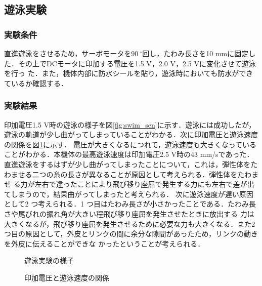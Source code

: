 \subsection{遊泳実験}
\subsubsection{実験条件}
直進遊泳をさせるため，サーボモータを$90\:^\circ$回し，たわみ長さを10 mmに固定した．その上でDCモータに印加する電圧を1.5 V，2.0 V，2.5 Vに変化させて遊泳を行っ
た．また，機体内部に防水シールを貼り，遊泳時においても防水ができているか確認する．



\subsubsection{実験結果}
印加電圧1.5 V時の遊泳の様子を図\ref{fig:swim_sen}に示す．遊泳には成功したが，遊泳の軌道が少し曲がってしまっていることがわかる．次に印加電圧と遊泳速度の関係を図\ref{fig:speed}に示す．
電圧が大きくなるにつれて，遊泳速度も大きくなっていることがわかる．本機体の最高遊泳速度は印加電圧2.5 V時の43 mm/sであった．
直進遊泳をするはずが少し曲がってしまったことについて，これは，弾性体をたわませる二つの糸の長さが異なることが原因として考えられる．弾性体をたわませ
る力が左右で違ったことにより飛び移り座屈で発生する力にも左右で差が出てしまうので，結果曲がってしまったと考えられる．
次に遊泳速度が遅い原因として2 つ考えられる．1 つ目はたわみ長さが小さかったことである．たわみ長さや尾びれの振れ角が大きい程飛び移り座屈を発生させたときに放出する
力は大きくなるが，飛び移り座屈を発生させるために必要な力も大きくなる．また2 つ目の原因として，外皮とリンクの間に余分な隙間があったため，リンクの動きを外皮に伝えることができな
かったということが考えられる．
\begin{figure}[htbp]
    \centering
    \begin{minipage}[b]{0.5\linewidth}
        \centering
        \caption{遊泳実験の様子\cite{kyu}}
        \label{fig:swim_sen}  
    \end{minipage}
    \hspace{0.05\linewidth}
    \begin{minipage}[b]{0.4\linewidth}
        \centering
        \caption{印加電圧と遊泳速度の関係\cite{kyu}}
        \label{fig:speed}  
    \end{minipage} 
\end{figure}
